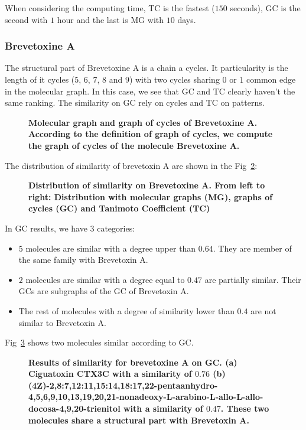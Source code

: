 \documentclass[10pt,letterpaper]{article}
\begin{document}
 
 When considering the computing time, TC is the fastest ($150$ seconds), GC is the second with $1$ hour and the last is MG with $10$ days.

 

\subsubsection*{Brevetoxine A}
 
The structural part of Brevetoxine A is a chain a cycles. It particularity is the length of it cycles ($5$, $6$, $7$, $8$ and $9$) with two cycles sharing $0$ or $1$ common edge in the molecular graph. In this case, we see that GC and TC clearly haven't the same ranking. The similarity on GC rely on cycles and TC on patterns.
 
\begin{figure}[!h]
	\caption{\bf{Molecular graph and graph of cycles of Brevetoxine A.}
	According to the definition of graph of cycles, we compute the graph of cycles of the molecule Brevetoxine A.}	
	\label{fig8}
\end{figure}
 
 The distribution of similarity of brevetoxin A are shown in the Fig~\ref{fig9}:
 
\begin{figure}[!h]
	\caption{\bf{Distribution of similarity on  Brevetoxine A.}
	From left to right: Distribution with molecular graphs (MG), graphs of cycles (GC) and Tanimoto Coefficient (TC)}
	\label{fig9}
\end{figure}

 In GC results, we have $3$ categories:
 \begin{itemize}
 
 \item $5 $ molecules are similar with a degree upper than $0.64$. They are member of the same family with Brevetoxin A.
 \item $2$ molecules are similar with a degree equal to $0.47$ are partially similar. Their GCs are subgraphs of the GC of Brevetoxin A.
 \item The rest of molecules with a degree of similarity lower than $0.4$ are not similar to Brevetoxin A.
 \end{itemize}
 
Fig~\ref{fig10} shows two molecules similar according to GC.
 
\begin{figure}[!h]
	\caption{\bf{Results of similarity for brevetoxine A on GC.}
	(a) Ciguatoxin CTX3C with a similarity of $0.76$ (b)(4Z)-2,8:7,12:11,15:14,18:17,22-pentaanhydro-4,5,6,9,10,13,19,20,21-nonadeoxy-L-arabino-L-allo-L-allo-docosa-4,9,20-trienitol with a similarity of $0.47$. These two molecules share a structural part with Brevetoxin A. }
	\label{fig10}
\end{figure}
 
\end{document}
